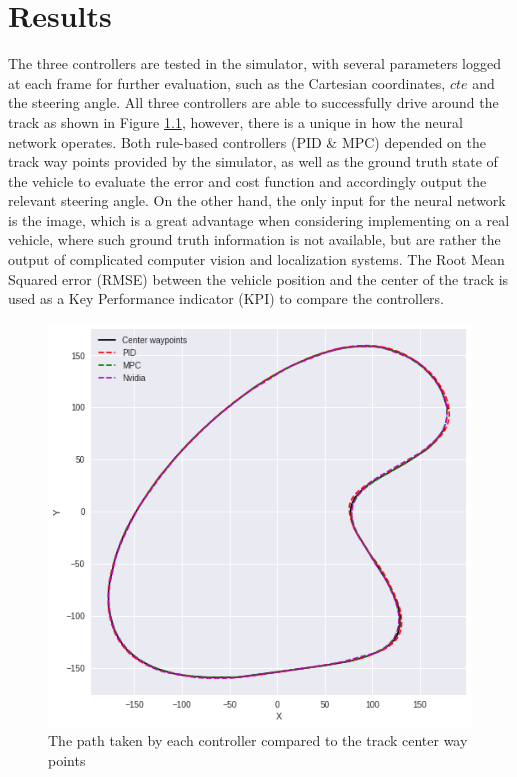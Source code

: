 \chapter{Results}
The three controllers are tested in the simulator, with several parameters logged at each frame for further evaluation, such as the Cartesian coordinates, \(cte\) and the steering angle. All three controllers are able to successfully drive around the track as shown in Figure \ref{coord}, however, there is a unique in how the neural network operates. Both rule-based controllers (PID \& MPC) depended on the track way points provided by the simulator, as well as the ground truth state of the vehicle to evaluate the error and cost function and accordingly output the relevant steering angle. On the other hand, the only input for the neural network is the image, which is a great advantage when considering implementing on a real vehicle, where such ground truth information is not available, but are rather the output of complicated computer vision and localization systems.
The Root Mean Squared error (RMSE) between the vehicle position and the center of the track is used as a Key Performance indicator (KPI) to compare the controllers.
\begin{figure}[htbp]
\centerline{
\includegraphics[width=0.8\linewidth]{plots/coord.png}}
\caption{The path taken by each controller compared to the track center way points}
\label{coord}
\end{figure}

